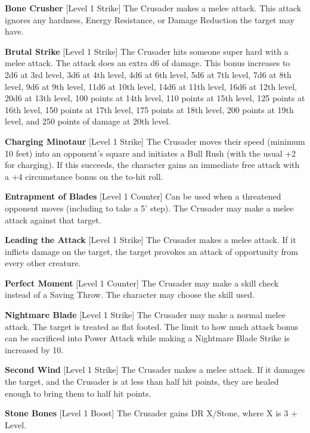 \newcommand{\crusadermaneuver}[4]{\textbf{#1} [Level #2 #3] #4\medskip{}}

\crusadermaneuver{Bone Crusher}{1}{Strike}{The Crusader makes a melee attack. This attack ignores any hardness, Energy Resistance, or Damage Reduction the target may have.}

\crusadermaneuver{Brutal Strike}{1}{Strike}{The Crusader hits someone super hard with a melee attack. The attack does an extra d6 of damage. This bonus increases to 2d6 at 3rd level, 3d6 at 4th level, 4d6 at 6th level, 5d6 at 7th level, 7d6 at 8th level, 9d6 at 9th level, 11d6 at 10th level, 14d6 at 11th level, 16d6 at 12th level, 20d6 at 13th level, 100 points at 14th level, 110 points at 15th level, 125 points at 16th level, 150 points at 17th level, 175 points at 18th level, 200 points at 19th level, and 250 points of damage at 20th level.}

\crusadermaneuver{Charging Minotaur}{1}{Strike}{The Crusader moves their speed (minimum 10 feet) into an opponent's square and initiates a Bull Rush (with the usual +2 for charging). If this succeeds, the character gains an immediate free attack with a +4 circumstance bonus on the to-hit roll.}

\crusadermaneuver{Entrapment of Blades}{1}{Counter}{Can be used when a threatened opponent moves (including to take a 5' step). The Crusader may make a melee attack against that target.}

\crusadermaneuver{Leading the Attack}{1}{Strike}{The Crusader makes a melee attack. If it inflicts damage on the target, the target provokes an attack of opportunity from every other creature.}

\crusadermaneuver{Perfect Moment}{1}{Counter}{The Crusader may make a skill check instead of a Saving Throw. The character may choose the skill used.}

\crusadermaneuver{Nightmare Blade}{1}{Strike}{The Crusader may make a normal melee attack. The target is treated as flat footed. The limit to how much attack bonus can be sacrificed into Power Attack while making a Nightmare Blade Strike is increased by 10.}

\crusadermaneuver{Second Wind}{1}{Strike}{The Crusader makes a melee attack. If it damages the target, and the Crusader is at less than half hit points, they are healed enough to bring them to half hit points.}

\crusadermaneuver{Stone Bones}{1}{Boost}{The Crusader gains DR X/Stone, where X is 3 + Level.}

